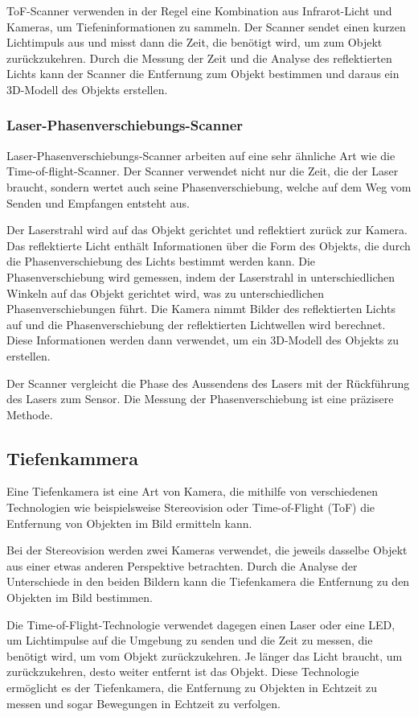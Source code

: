 ToF-Scanner verwenden in der Regel eine Kombination aus Infrarot-Licht und Kameras, um Tiefeninformationen zu sammeln. Der Scanner sendet einen kurzen Lichtimpuls aus und misst dann die Zeit, die benötigt wird, um zum Objekt zurückzukehren. Durch die Messung der Zeit und die Analyse des reflektierten Lichts kann der Scanner die Entfernung zum Objekt bestimmen und daraus ein 3D-Modell des Objekts erstellen.

\subsubsection{Laser-Phasenverschiebungs-Scanner}
Laser-Phasenverschiebungs-Scanner arbeiten auf eine sehr ähnliche Art wie die Time-of-flight-Scanner. Der Scanner verwendet nicht nur die Zeit, die der Laser braucht, sondern wertet auch seine Phasenverschiebung, welche auf dem Weg vom Senden und Empfangen entsteht aus.

Der Laserstrahl wird auf das Objekt gerichtet und reflektiert zurück zur Kamera. Das reflektierte Licht enthält Informationen über die Form des Objekts, die durch die Phasenverschiebung des Lichts bestimmt werden kann. Die Phasenverschiebung wird gemessen, indem der Laserstrahl in unterschiedlichen Winkeln auf das Objekt gerichtet wird, was zu unterschiedlichen Phasenverschiebungen führt. Die Kamera nimmt Bilder des reflektierten Lichts auf und die Phasenverschiebung der reflektierten Lichtwellen wird berechnet. Diese Informationen werden dann verwendet, um ein 3D-Modell des Objekts zu erstellen.

Der Scanner vergleicht die Phase des Aussendens des Lasers mit der Rückführung des Lasers zum Sensor. Die Messung der Phasenverschiebung ist eine präzisere Methode.

\subsection{Tiefenkammera}
Eine Tiefenkamera ist eine Art von Kamera, die mithilfe von verschiedenen Technologien wie beispielsweise Stereovision oder Time-of-Flight (ToF) die Entfernung von Objekten im Bild ermitteln kann.

Bei der Stereovision werden zwei Kameras verwendet, die jeweils dasselbe Objekt aus einer etwas anderen Perspektive betrachten. Durch die Analyse der Unterschiede in den beiden Bildern kann die Tiefenkamera die Entfernung zu den Objekten im Bild bestimmen.

Die Time-of-Flight-Technologie verwendet dagegen einen Laser oder eine LED, um Lichtimpulse auf die Umgebung zu senden und die Zeit zu messen, die benötigt wird, um vom Objekt zurückzukehren. Je länger das Licht braucht, um zurückzukehren, desto weiter entfernt ist das Objekt. Diese Technologie ermöglicht es der Tiefenkamera, die Entfernung zu Objekten in Echtzeit zu messen und sogar Bewegungen in Echtzeit zu verfolgen.

